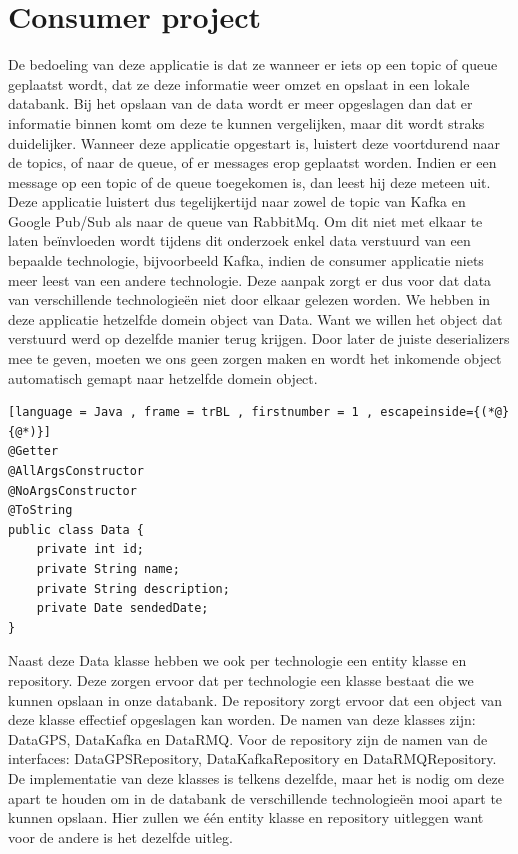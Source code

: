 \section{Consumer project}
De bedoeling van deze applicatie is dat ze wanneer er iets op een topic of queue geplaatst wordt, dat ze deze informatie weer omzet en opslaat in een lokale databank. Bij het opslaan van de data wordt er meer opgeslagen dan dat er informatie binnen komt om deze te kunnen vergelijken, maar dit wordt straks duidelijker. Wanneer deze applicatie opgestart is, luistert deze voortdurend naar de topics, of naar de queue, of er messages erop geplaatst worden. Indien er een message op een topic of de queue toegekomen is, dan leest hij deze meteen uit. Deze applicatie luistert dus tegelijkertijd naar zowel de topic van Kafka en Google Pub/Sub als naar de queue van RabbitMq. Om dit niet met elkaar te laten beïnvloeden wordt tijdens dit onderzoek enkel data verstuurd van een bepaalde technologie, bijvoorbeeld Kafka, indien de consumer applicatie niets meer leest van een andere technologie. Deze aanpak zorgt er dus voor dat data van verschillende technologieën niet door elkaar gelezen worden. We hebben in deze applicatie hetzelfde domein object van Data. Want we willen het object dat verstuurd werd op dezelfde manier terug krijgen. Door later de juiste deserializers mee te geven, moeten we ons geen zorgen maken en wordt het inkomende object automatisch gemapt naar hetzelfde domein object.
\begin{lstlisting}[language = Java , frame = trBL , firstnumber = 1 , escapeinside={(*@}{@*)}]
@Getter
@AllArgsConstructor
@NoArgsConstructor
@ToString
public class Data {
    private int id;
    private String name;
    private String description;
    private Date sendedDate;
}
\end{lstlisting}

Naast deze Data klasse hebben we ook per technologie een entity klasse en repository. Deze zorgen ervoor dat per technologie een klasse bestaat die we kunnen opslaan in onze databank. De repository zorgt ervoor dat een object van deze klasse effectief opgeslagen kan worden. De namen van deze klasses zijn: DataGPS, DataKafka en DataRMQ. Voor de repository zijn de namen van de interfaces: DataGPSRepository, DataKafkaRepository en DataRMQRepository. De implementatie van deze klasses is telkens dezelfde, maar het is nodig om deze apart te houden om in de databank de verschillende technologieën mooi apart te kunnen opslaan. Hier zullen we één entity klasse en repository uitleggen want voor de andere is het dezelfde uitleg.

